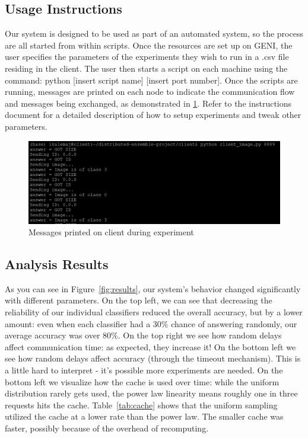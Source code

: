\documentclass[11pt]{article}
\begin{document}
\subsection{Usage Instructions}

Our system is designed to be used as part of an automated system, so the process are all started from within scripts. Once the resources are set up on GENI, the user specifies the parameters of the experiments they wish to run in a .csv file residing in the client. The user then starts a script on each machine using the command: python [insert script name] [insert port number]. Once the scripts are running, messages are printed on each node to indicate the communication flow and messages being exchanged, as demonstrated in \ref{fig:client_screenshot}. Refer to the instructions document for a detailed description of how to setup experiments and tweak other parameters. 

\begin{figure}[t]
	\centering
	\includegraphics[scale=0.8]{client_screenshot.png}
	\caption{Messages printed on client during experiment}
	\label{fig:client_screenshot}
\end{figure}

\subsection{Analysis Results}


As you can see in Figure~\ref{fig:results}, our system's behavior changed significantly with different parameters.
On the top left, we can see that decreasing the reliability of our individual classifiers reduced the overall accuracy, but by a lower amount: 
    even when each classifier had a 30\% chance of answering randomly, our average accuracy was over 80\%.
On the top right we see how random delays affect communication time: as expected, they increase it!
On the bottom left we see how random delays affect accuracy (through the timeout mechanism).
This is a little hard to interpret - it's possible more experiments are needed.
On the bottom left we visualize how the cache is used over time: while the uniform distribution rarely gets used, the power law linearity means roughly one in three requests hits the cache.
Table~\ref{tab:cache} shows that the uniform sampling utilized the cache at a lower rate than the power law.
The smaller cache was faster, possibly because of the overhead of recomputing.
\end{document}
